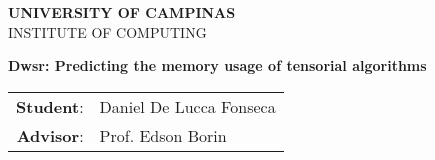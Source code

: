 \documentclass[11pt]{article}
\begin{document}


\begin{titlepage} 

    \begin{center} 
        \large \textbf{UNIVERSITY OF CAMPINAS}\\
        \large INSTITUTE OF COMPUTING\\
        
        \vspace{0.5cm}

        \begin{minipage}[tl]{31mm}
        \end{minipage}

        \vspace{0.3cm}
        \textbf{Dwsr: Predicting the memory usage of tensorial algorithms}
        \vspace{0.2cm}

        \begin{tabular}{rl}
            \textbf{Student}: & Daniel De Lucca Fonseca \\
            \textbf{Advisor}: & Prof. Edson Borin \\
        \end{tabular}

    \end{center}


\end{titlepage} 


\newcommand{\EB}[1]{{\bf \textcolor{red}{(EB: #1)}}}
\newcommand{\EBH}[1]{\hl{#1}}
\newcommand{\EBC}[2]{\EBH{#1} \EB{#2}}
\newcommand{\EBADD}[1]{{\textcolor{red}{#1}}}
\newcommand{\EBRM}[1]{{\textcolor{lightgray}{(#1)}}}
\newcommand{\EBRP}[2]{\EBRM{#1}\EBADD{#2}}
\newcommand{\EBRPD}[2]{#1 \EB{#1 $\rightarrow$ #2?}}

\newcommand{\DF}[1]{{\bf \textcolor{blue}{(DF: #1)}}}
\newcommand{\DFH}[1]{\hl{#1}}
\newcommand{\DFC}[2]{\DFH{#1} \DF{#2}}
\newcommand{\DFADD}[1]{{\textcolor{blue}{#1}}}
\newcommand{\DFRM}[1]{{\textcolor{lightgray}{(#1)}}}
\newcommand{\DFRP}[2]{\DFRM{#1}\DFADD{#2}}
\newcommand{\DFRPD}[2]{#1 \DF{#1 $\rightarrow$ #2?}}


\setlength{\baselineskip}{0.1 cm}
 \pagebreak
\normalsize \tableofcontents \pagebreak
{}

\acresetall






\begin{footnotesize}
\printbibliography
\end{footnotesize}
\end{document}
